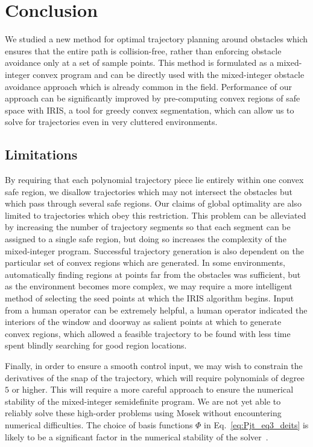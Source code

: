 \chapter{Conclusion}

We studied a new method for optimal trajectory planning around obstacles which ensures that the entire path is collision-free, rather than enforcing obstacle avoidance only at a set of sample points. This method is formulated
as a mixed-integer convex program and can be directly used with the mixed-integer obstacle avoidance approach which is already common in the field. Performance of our approach can be significantly improved by pre-computing convex regions of safe space with IRIS, a tool for greedy convex
segmentation, which can allow us to solve for trajectories even in very cluttered environments.

\section{Limitations}

By requiring that each polynomial trajectory piece lie entirely within one convex safe region, we disallow trajectories which may not intersect the obstacles but which pass through several safe regions. Our claims of global optimality are also limited to trajectories which obey this restriction.
This problem can be alleviated by increasing the number of trajectory segments so that each segment can be assigned to a single safe region, but doing so increases the complexity of the mixed-integer program. Successful trajectory generation is also dependent on the particular set of convex regions which are generated. In some environments, automatically finding regions at points far from the obstacles was sufficient, but as the
environment becomes more complex, we may require a more intelligent method of selecting the seed points at which the IRIS algorithm begins. Input from a human operator can be extremely helpful, a human operator indicated the interiors of the window and doorway as salient points at which to
generate convex regions, which allowed a feasible trajectory to be found with less time spent blindly searching for good
region locations.


Finally, in order to ensure a smooth control input, we may
wish to constrain the derivatives of the snap of the trajectory,
which will require polynomials of degree $5$ or higher. This
will require a more careful approach to ensure the numerical
stability of the mixed-integer semidefinite program. We are
not yet able to reliably solve these high-order problems
using Mosek without encountering numerical difficulties. The choice of basis functions $\Phi$ in Eq.~\ref{eq:Pjt_eq3_deits} is
likely to be a significant factor in the numerical stability
of the solver~\cite{mellinger2012mixed}. 

